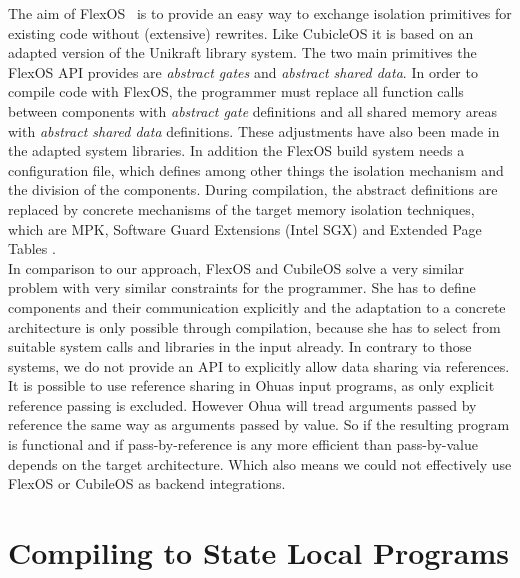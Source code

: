 The aim of FlexOS~\cite{lefeuvre2021flexos} is to provide an easy way to exchange isolation primitives for existing code without (extensive) rewrites. Like CubicleOS it is based on an adapted version of the Unikraft library system. The two main primitives the FlexOS API provides are \emph{abstract gates} and \emph{abstract shared data}. In order to compile code with FlexOS, the programmer must replace all function calls between components with \emph{abstract gate} definitions and all shared memory areas with \emph{abstract shared data} definitions. These adjustments have also been made in the adapted system libraries. In addition the FlexOS build system needs a configuration file, which defines among other things the isolation mechanism and the division of the components. During compilation, the abstract definitions are replaced by concrete mechanisms of the target memory isolation techniques, which are MPK, Software Guard Extensions (Intel SGX) and Extended Page Tables \cite{intel64and}. \\

In comparison to our approach, FlexOS and CubileOS solve a very similar problem with very similar constraints for the programmer. She has to define components and their communication explicitly and the adaptation to a concrete architecture is only possible through compilation, because she has to select from suitable system calls and libraries in the input already. In contrary to those systems, we do not provide an API to explicitly allow data sharing via references. It is possible to use reference sharing in Ohuas input programs, as only explicit reference passing is excluded. However Ohua will tread arguments passed by reference the same way as arguments passed by value. So if the resulting program is functional and if pass-by-reference is any more efficient than pass-by-value depends on the target architecture. Which also means we could not effectively use FlexOS or CubileOS as backend integrations.


\section{Compiling to State Local Programs}

